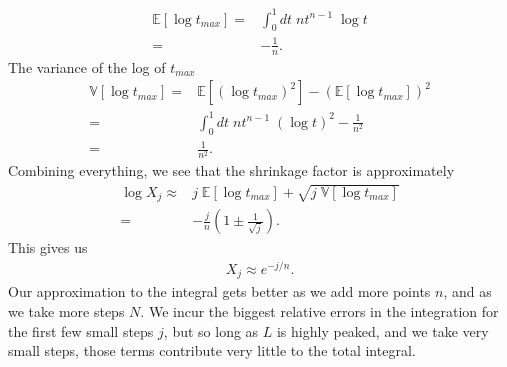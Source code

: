 \begin{align}
    \mathbb{E}\left[\log t_{max}\right]
    =&
    \int_0^1 dt \;n t^{n-1}\;\log t 
    \nonumber\\
    =&
    -
    \frac{1}{n}
    .
\end{align}
The variance of the log of $t_{max}$
\begin{align}
    \mathbb{V}\left[\log t_{max}\right]
    =&
    \mathbb{E}\left[\left(\log t_{max}\right)^2\right]
    -
    \left(\mathbb{E}\left[\log t_{max}\right]\right)^2
    \nonumber\\
    =&
    \int_0^1 dt \; n t^{n-1} \; \left(\log t\right)^2
    -
    \frac{1}{n^2}
    \nonumber\\
    =&
    \frac{1}{n^2}
    .
\end{align}
Combining everything, we see that the shrinkage factor is approximately
\begin{align}
    \log X_j
    \approx&
    j \; \mathbb{E}\left[ \log t_{max}\right]
    +
    \sqrt{j \; \mathbb{V}\left[\log t_{max}\right]}
    \nonumber\\
    =&
    -
    \frac{j}{n}\left(1 \pm \frac{1}{\sqrt{j}}\right) 
    .
\end{align}
This gives us
\begin{align}
    X_j
    \approx 
    e^{-j/n}
    .
\end{align}
Our approximation to the integral gets better as we add more points $n$,
and as we take more steps $N$. 
We incur the biggest relative errors in the integration for the first few small
steps $j$, but so long as $L$ is highly peaked, and we take very small steps,
those terms contribute very little to the total integral.
